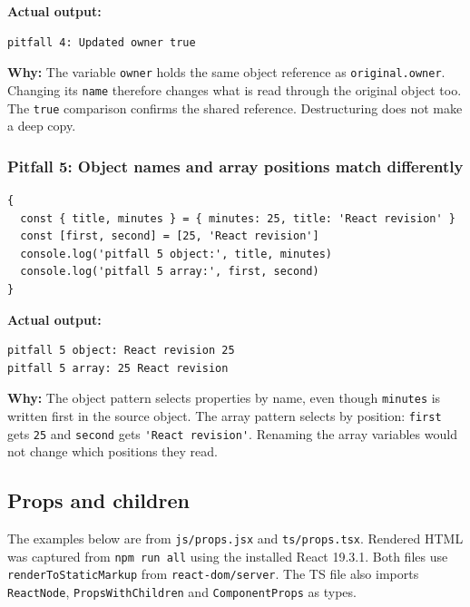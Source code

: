 \documentclass[
  11pt,
]{article}
\newcommand{\passthrough}[1]{#1}
\begin{document}
\textbf{Actual output:}

\begin{lstlisting}
pitfall 4: Updated owner true
\end{lstlisting}

\textbf{Why:} The variable \passthrough{\lstinline!owner!} holds the
same object reference as \passthrough{\lstinline!original.owner!}.
Changing its \passthrough{\lstinline!name!} therefore changes what is
read through the original object too. The \passthrough{\lstinline!true!}
comparison confirms the shared reference. Destructuring does not make a
deep copy.

\subsubsection{Pitfall 5: Object names and array positions match
differently}\label{pitfall-5-object-names-and-array-positions-match-differently}

\begin{lstlisting}
{
  const { title, minutes } = { minutes: 25, title: 'React revision' }
  const [first, second] = [25, 'React revision']
  console.log('pitfall 5 object:', title, minutes)
  console.log('pitfall 5 array:', first, second)
}
\end{lstlisting}

\textbf{Actual output:}

\begin{lstlisting}
pitfall 5 object: React revision 25
pitfall 5 array: 25 React revision
\end{lstlisting}

\textbf{Why:} The object pattern selects properties by name, even though
\passthrough{\lstinline!minutes!} is written first in the source object.
The array pattern selects by position: \passthrough{\lstinline!first!}
gets \passthrough{\lstinline!25!} and \passthrough{\lstinline!second!}
gets \passthrough{\lstinline!'React revision'!}. Renaming the array
variables would not change which positions they read.

\subsection{Props and children}\label{props-and-children}

The examples below are from \passthrough{\lstinline!js/props.jsx!} and
\passthrough{\lstinline!ts/props.tsx!}. Rendered HTML was captured from
\passthrough{\lstinline!npm run all!} using the installed React 19.3.1.
Both files use \passthrough{\lstinline!renderToStaticMarkup!} from
\passthrough{\lstinline!react-dom/server!}. The TS file also imports
\passthrough{\lstinline!ReactNode!},
\passthrough{\lstinline!PropsWithChildren!} and
\passthrough{\lstinline!ComponentProps!} as types.
\end{document}
